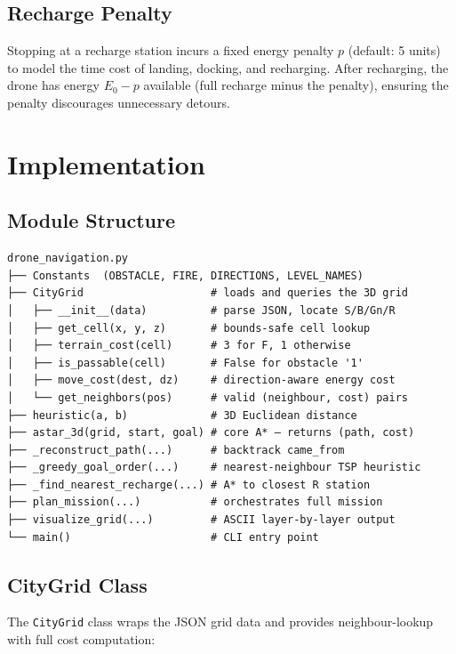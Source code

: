 \documentclass[12pt]{article}
\begin{document}
\subsection{Recharge Penalty}

Stopping at a recharge station incurs a fixed energy penalty $p$ (default: 5
units) to model the time cost of landing, docking, and recharging.
After recharging, the drone has energy $E_0 - p$ available (full recharge
minus the penalty), ensuring the penalty discourages unnecessary detours.

\section{Implementation}

\subsection{Module Structure}

\begin{lstlisting}[caption={Module-level layout of drone\_navigation.py}]
drone_navigation.py
├── Constants  (OBSTACLE, FIRE, DIRECTIONS, LEVEL_NAMES)
├── CityGrid                    # loads and queries the 3D grid
│   ├── __init__(data)          # parse JSON, locate S/B/Gn/R
│   ├── get_cell(x, y, z)       # bounds-safe cell lookup
│   ├── terrain_cost(cell)      # 3 for F, 1 otherwise
│   ├── is_passable(cell)       # False for obstacle '1'
│   ├── move_cost(dest, dz)     # direction-aware energy cost
│   └── get_neighbors(pos)      # valid (neighbour, cost) pairs
├── heuristic(a, b)             # 3D Euclidean distance
├── astar_3d(grid, start, goal) # core A* — returns (path, cost)
├── _reconstruct_path(...)      # backtrack came_from
├── _greedy_goal_order(...)     # nearest-neighbour TSP heuristic
├── _find_nearest_recharge(...) # A* to closest R station
├── plan_mission(...)           # orchestrates full mission
├── visualize_grid(...)         # ASCII layer-by-layer output
└── main()                      # CLI entry point
\end{lstlisting}

\subsection{CityGrid Class}

The \texttt{CityGrid} class wraps the JSON grid data and provides
neighbour-lookup with full cost computation:
\end{document}
